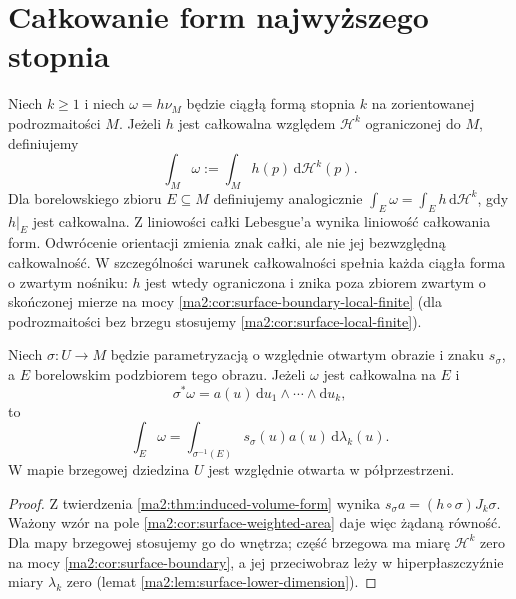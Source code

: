 \section{Całkowanie form najwyższego stopnia}

\begin{definicja}
\label{ma2:def:integral-top-form}
Niech $k\ge1$ i niech $\omega=h\nu_M$ będzie ciągłą formą
stopnia $k$ na zorientowanej podrozmaitości $M$.
Jeżeli $h$ jest całkowalna względem
$\mathcal H^k$ ograniczonej do $M$, definiujemy
\[
 \int_M\omega:=\int_M h(p)\,\mathrm d\mathcal H^k(p).
\]
Dla borelowskiego zbioru $E\subseteq M$ definiujemy
analogicznie $\int_E\omega=\int_E h\,\mathrm d\mathcal H^k$,
gdy $h|_E$ jest całkowalna. Z liniowości całki
Lebesgue'a wynika liniowość całkowania form.
Odwrócenie orientacji zmienia znak całki,
ale nie jej bezwzględną całkowalność.
W szczególności warunek całkowalności spełnia
każda ciągła forma o zwartym nośniku:
$h$ jest wtedy ograniczona i znika poza zbiorem
zwartym o skończonej mierze na mocy
\ref{ma2:cor:surface-boundary-local-finite}
(dla podrozmaitości bez brzegu stosujemy
\ref{ma2:cor:surface-local-finite}).
\end{definicja}

\begin{twierdzenie}
\label{ma2:thm:integral-top-form-chart}
Niech $\sigma:U\to M$ będzie parametryzacją
o względnie otwartym obrazie i znaku $s_\sigma$,
a $E$ borelowskim podzbiorem tego obrazu.
Jeżeli $\omega$ jest całkowalna na $E$ i
\[
 \sigma^*\omega=a(u)\,\mathrm du_1\wedge\cdots
 \wedge\mathrm du_k,
\]
to
\[
 \int_E\omega=\int_{\sigma^{-1}(E)}s_\sigma(u)a(u)\,
 \mathrm d\lambda_k(u).
\]
W mapie brzegowej dziedzina $U$ jest względnie
otwarta w półprzestrzeni.
\end{twierdzenie}
\begin{proof}
Z twierdzenia \ref{ma2:thm:induced-volume-form}
wynika $s_\sigma a=(h\circ\sigma)J_k\sigma$.
Ważony wzór na pole
\ref{ma2:cor:surface-weighted-area} daje więc
żądaną równość. Dla mapy brzegowej stosujemy
go do wnętrza; część brzegowa ma miarę
$\mathcal H^k$ zero na mocy
\ref{ma2:cor:surface-boundary}, a jej
przeciwobraz leży w hiperpłaszczyźnie
miary $\lambda_k$ zero (lemat
\ref{ma2:lem:surface-lower-dimension}).
\end{proof}

